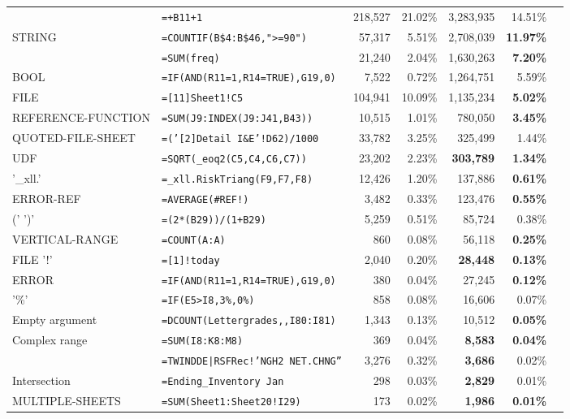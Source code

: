 \documentclass[conference]{IEEEtran}
\begin{document}
\begin{table}
\begin{tabular}{llrrrrr}
		\synt{UnOpPrefix} & \texttt{=+B11+1}  & 218,527 & 21.02\% & 3,283,935 & 14.51\%\\
		STRING & \texttt{=COUNTIF(B\$4:B\$46,">=90")}  & 57,317 & 5.51\% & 2,708,039 &\textbf{11.97\%}\\
		\synt{NamedRange} & \texttt{=SUM(freq)}  & 21,240 & 2.04\% & 1,630,263 & \textbf{7.20\%}\\
		BOOL & \texttt{=IF(AND(R11=1,R14=TRUE),G19,0)}  & 7,522 & 0.72\% & 1,264,751 & 5.59\%\\
		FILE & \texttt{=[11]Sheet1!C5}  & 104,941 & 10.09\% & 1,135,234 & \textbf{5.02\%}\\
		REFERENCE-FUNCTION & \texttt{=SUM(J9:INDEX(J9:J41,B43))}  & 10,515 & 1.01\% & 780,050 &\textbf{ 3.45\%}\\
		QUOTED-FILE-SHEET & \texttt{=('[2]Detail I\&E'!D62)/1000}  & 33,782 & 3.25\% & 325,499 & 1.44\%\\
		UDF & \texttt{=SQRT(_eoq2(C5,C4,C6,C7))}  & 23,202 & 2.23\% & \textbf{303,789} & \textbf{1.34\%}\\
		'_xll.' & \texttt{=_xll.RiskTriang(F9,F7,F8)}  & 12,426 & 1.20\% & 137,886 & \textbf{0.61\%}\\
		ERROR-REF & \texttt{=AVERAGE(\#REF!)}  & 3,482 & 0.33\% & 123,476 & \textbf{0.55\%}\\
		(' \synt{Reference} ')' & \texttt{=(2*(B29))/(1+B29)}  & 5,259 & 0.51\% & 85,724 & 0.38\%\\
		VERTICAL-RANGE & \texttt{=COUNT(A:A)}  & 860 & 0.08\% & 56,118 & \textbf{0.25\%}\\
		FILE '!' & \texttt{=[1]!today}  & 2,040 & 0.20\% & \textbf{28,448} &\textbf{0.13\%}\\
		ERROR & \texttt{=IF(AND(R11=1,R14=TRUE),G19,0)}  & 380 & 0.04\% & 27,245 & \textbf{0.12\%}\\
		'\%' & \texttt{=IF(E5>I8,3\%,0\%)}  & 858 & 0.08\% & 16,606 & 0.07\%\\
			Empty argument & \texttt{=DCOUNT(Lettergrades,,I80:I81)}  & 1,343 & 0.13\% & 10,512 & \textbf{0.05\%}\\
			Complex range & \texttt{=SUM(I8:K8:M8)}  & 369 & 0.04\% & \textbf{8,583} &\textbf{0.04\%}\\
			\synt{DynamicDataExchange} & \texttt{=TWINDDE|RSFRec!'NGH2 NET.CHNG''}  & 3,276 & 0.32\% & \textbf{3,686} & 0.02\%\\
			Intersection & \texttt{=Ending_Inventory Jan}  & 298 & 0.03\% & \textbf{2,829} & 0.01\%\\
			MULTIPLE-SHEETS & \texttt{=SUM(Sheet1:Sheet20!I29)}  & 173 & 0.02\% &\textbf{1,986} &\textbf{ 0.01\%}\\

\end{tabular}
\end{table}
\end{document}
